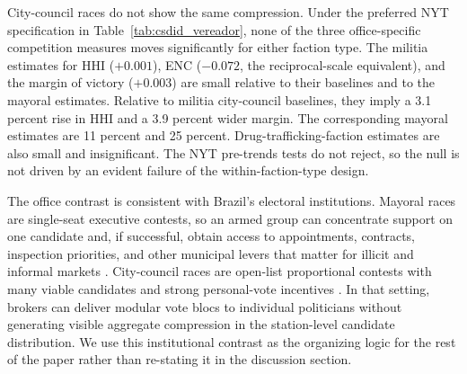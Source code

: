 \documentclass[11pt]{article}
\begin{document}
City-council races do not show the same compression. Under the preferred NYT specification in Table~\ref{tab:csdid_vereador}, none of the three office-specific competition measures moves significantly for either faction type. The militia estimates for HHI ($+0.001$), ENC ($-0.072$, the reciprocal-scale equivalent), and the margin of victory ($+0.003$) are small relative to their baselines and to the mayoral estimates. Relative to militia city-council baselines, they imply a 3.1 percent rise in HHI and a 3.9 percent wider margin. The corresponding mayoral estimates are 11 percent and 25 percent. Drug-trafficking-faction estimates are also small and insignificant. The NYT pre-trends tests do not reject, so the null is not driven by an evident failure of the within-faction-type design.

The office contrast is consistent with Brazil's electoral institutions. Mayoral races are single-seat executive contests, so an armed group can concentrate support on one candidate and, if successful, obtain access to appointments, contracts, inspection priorities, and other municipal levers that matter for illicit and informal markets \citep{ferraz2011electoral, monteiro2023enterprises}. City-council races are open-list proportional contests with many viable candidates and strong personal-vote incentives \citep{carey1995personal, novaes2018brokers}. In that setting, brokers can deliver modular vote blocs to individual politicians without generating visible aggregate compression in the station-level candidate distribution. We use this institutional contrast as the organizing logic for the rest of the paper rather than re-stating it in the discussion section.
\end{document}
